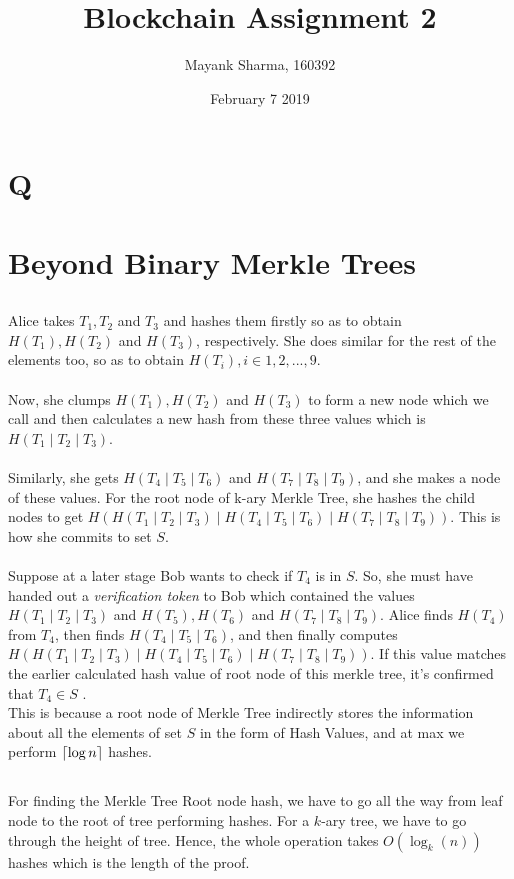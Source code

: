 \documentclass[12pt, a4paper]{article}
\title{Blockchain Assignment 2}
\author{Mayank Sharma, 160392}
\date{February 7 2019}
\DeclarePairedDelimiter{\ceil}{\lceil}{\rceil}
\newcommand{\ti}{\textit}
\begin{document}
\maketitle
\section{Q}

\section{Beyond Binary Merkle Trees}
\subsection{}
Alice takes $T_1, T_2$ and $ T_3$ and hashes them firstly so as to obtain $H(T_1), H(T_2)$ and $ H(T_3)$, respectively. She does similar for the rest of the elements too, so as to obtain $H(T_i), i \in {1, 2, ..., 9}$.
\\ \\
Now, she clumps $H(T_1), H(T_2)$ and $ H(T_3)$ to form a new node which we call and then calculates a new hash from these three values which is $H(T_1 \mid T_2 \mid T_3)$.  \\ \\
Similarly, she gets $H(T_4 \mid T_5 \mid T_6)$ and $H(T_7 \mid T_8 \mid T_9)$, and she makes a node of these values. For the root node of k-ary Merkle Tree, 
she hashes the child nodes to get $H(H(T_1 \mid T_2 \mid T_3) \mid H(T_4 \mid T_5 \mid T_6) \mid H(T_7 \mid T_8 \mid T_9))$. This is how she commits to set $S$. \\ \\ 
Suppose at a later stage Bob wants to check if $T_4$ is in $S$. So, she must have handed out a \ti{verification token} to Bob which contained the values 
$H(T_1 \mid T_2 \mid T_3)$ and $H(T_5), H(T_6)$ and $H(T_7 \mid T_8 \mid T_9)$. Alice finds $H(T_4)$ from $T_4$, then finds $H(T_4 \mid T_5 \mid T_6)$, and then finally computes $H(H(T_1 \mid T_2 \mid T_3) \mid H(T_4 \mid T_5 \mid T_6) \mid H(T_7 \mid T_8 \mid T_9))$. If this value matches the earlier calculated hash value of root node of this merkle tree, it's confirmed that $T_4 \in S$ .
\\ 
This is because a root node of Merkle Tree indirectly stores the information about all the elements of set $S$ in the form of Hash Values, and at max we perform $\ceil{\log n}$ hashes.

\subsection{}
For finding the Merkle Tree Root node hash, we have to go all the way from leaf node to the root of tree performing hashes. For a $k$-ary tree, we have to go through the height of tree. Hence, the whole operation takes $O(\log_k (n))$ hashes which is the length of the proof.
\end{document}
